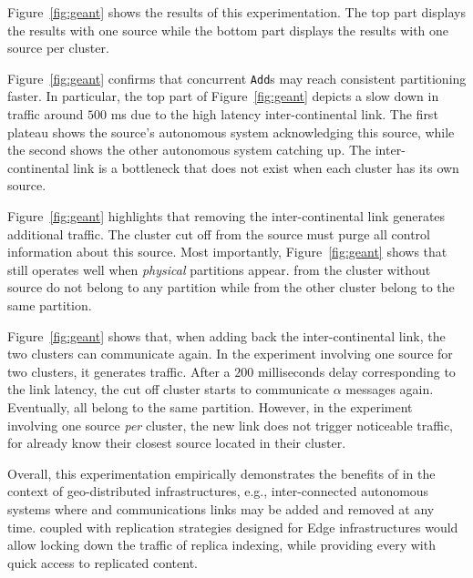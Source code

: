 \begin{asparadesc}
Figure~\ref{fig:geant} shows the results of this experimentation. The
top part displays the results with one source while the bottom part
displays the results with one source per cluster.

\noindent Figure~\ref{fig:geant} confirms that concurrent
\texttt{Add}s may reach consistent partitioning faster. In particular,
the top part of Figure~\ref{fig:geant} depicts a slow down in traffic
around $500$ ms due to the high latency inter-continental link. The
first plateau shows the source's autonomous system acknowledging this
source, while the second shows the other autonomous system catching
up.  The inter-continental link is a bottleneck that does not exist
when each cluster has its own source.

\noindent Figure~\ref{fig:geant} highlights that removing the
inter-continental link generates additional traffic. The cluster cut
off from the source must purge all control information about this
source.  Most importantly, Figure~\ref{fig:geant} shows that \NAME
still operates well when \emph{physical} partitions appear. \Processes
from the cluster without source do not belong to any partition while
\processes from the other cluster belong to the same partition. 

\noindent Figure~\ref{fig:geant} shows that, when adding back the
inter-continental link, the two clusters can communicate again. In the
experiment involving one source for two clusters, it generates
traffic. After a $200$ milliseconds delay corresponding to the link
latency, the cut off cluster starts to communicate $\alpha$ messages
again. Eventually, all \processes belong to the same
partition. However, in the experiment involving one source \emph{per}
cluster, the new link does not trigger noticeable traffic, for
\processes already know their closest source located in their cluster.

\noindent Overall, this experimentation empirically demonstrates the
benefits of \NAME in the context of geo-distributed infrastructures,
e.g., inter-connected autonomous systems where \processes and
communications links may be added and removed at any time. \NAME
coupled with replication strategies designed for Edge infrastructures
would allow locking down the traffic of replica indexing, while
providing every \process with quick access to replicated content.

\end{asparadesc}

